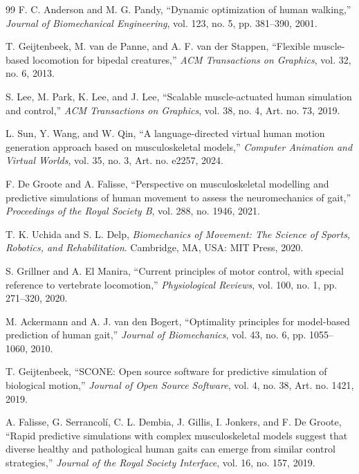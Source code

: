 \documentclass[acmtog,screen]{acmart}
\begin{document}
\FloatBarrier
\begin{thebibliography}{99}
F. C. Anderson and M. G. Pandy, ``Dynamic optimization of human walking,''
\textit{Journal of Biomechanical Engineering}, vol. 123, no. 5, pp. 381--390,
2001.

T. Geijtenbeek, M. van de Panne, and A. F. van der Stappen, ``Flexible
muscle-based locomotion for bipedal creatures,'' \textit{ACM Transactions on
Graphics}, vol. 32, no. 6, 2013.

S. Lee, M. Park, K. Lee, and J. Lee, ``Scalable muscle-actuated human
simulation and control,'' \textit{ACM Transactions on Graphics}, vol. 38,
no. 4, Art. no. 73, 2019.

L. Sun, Y. Wang, and W. Qin, ``A language-directed virtual human motion
generation approach based on musculoskeletal models,'' \textit{Computer
Animation and Virtual Worlds}, vol. 35, no. 3, Art. no. e2257, 2024.

F. De Groote and A. Falisse, ``Perspective on musculoskeletal modelling and
predictive simulations of human movement to assess the neuromechanics of
gait,'' \textit{Proceedings of the Royal Society B}, vol. 288, no. 1946, 2021.

T. K. Uchida and S. L. Delp, \textit{Biomechanics of Movement: The Science of
Sports, Robotics, and Rehabilitation}. Cambridge, MA, USA: MIT Press, 2020.

S. Grillner and A. El Manira, ``Current principles of motor control, with
special reference to vertebrate locomotion,'' \textit{Physiological Reviews},
vol. 100, no. 1, pp. 271--320, 2020.

M. Ackermann and A. J. van den Bogert, ``Optimality principles for model-based
prediction of human gait,'' \textit{Journal of Biomechanics}, vol. 43, no. 6,
pp. 1055--1060, 2010.

T. Geijtenbeek, ``SCONE: Open source software for predictive simulation of
biological motion,'' \textit{Journal of Open Source Software}, vol. 4, no. 38,
Art. no. 1421, 2019.

A. Falisse, G. Serrancol{\'i}, C. L. Dembia, J. Gillis, I. Jonkers, and
F. De Groote, ``Rapid predictive simulations with complex musculoskeletal
models suggest that diverse healthy and pathological human gaits can emerge
from similar control strategies,'' \textit{Journal of the Royal Society
Interface}, vol. 16, no. 157, 2019.


\end{thebibliography}
\end{document}
